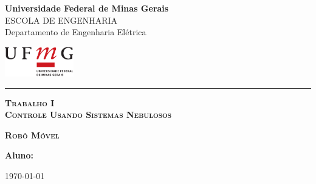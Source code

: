 \thispagestyle{empty}

\noindent
\begin{minipage}{0.8\linewidth}
  {\Large\bf Universidade Federal de Minas Gerais}\\
  {\small ESCOLA DE ENGENHARIA}\\
  {\sc Departamento de Engenharia Elétrica}
\end{minipage} 
\hfill 
\begin{minipage}{3cm}
  \includegraphics[width=3cm]{ufmg_ext.pdf}
\end{minipage}

\vspace{1mm}

\noindent
\hrule

\vspace{2.0cm}

\vfill

\begin{center}
  \Large \textsc{\textbf{Trabalho I}}\\ 
  \Large \textsc{\textbf{Controle Usando Sistemas Nebulosos}}
\end{center}

\vfill

\begin{center}
  \Large\textsc{\textbf{Robô Móvel}}
\end{center}

\vfill

\begin{flushright}
\begin{minipage}{12.0cm}
{\bf Aluno:} \nomeAluno \\
\end{minipage}
\end{flushright}

\vfill

\begin{center}
  \today
\end{center}

\vfill

\newpage